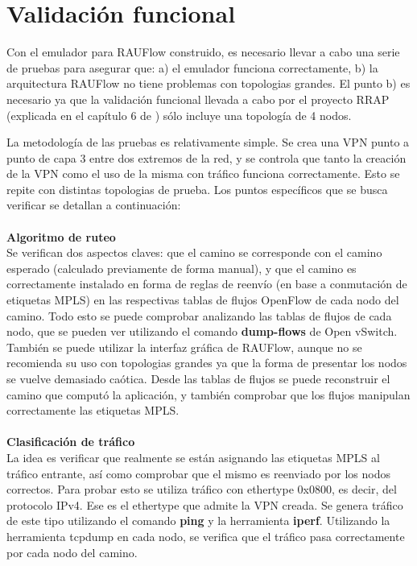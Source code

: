 \section{Validación funcional}
Con el emulador para RAUFlow construido, es necesario llevar a cabo una serie de pruebas para asegurar que: a) el emulador funciona correctamente, b) la arquitectura RAUFlow no tiene problemas con topologias grandes. El punto b) es necesario ya que la validación funcional llevada a cabo por el proyecto RRAP (explicada en el capítulo 6 de \cite{proyecto-rrap}) sólo incluye una topología de 4 nodos.

La metodología de las pruebas es relativamente simple. Se crea una VPN punto a punto de capa 3 entre dos extremos de la red, y se controla que tanto la creación de la VPN como el uso de la misma con tráfico funciona correctamente. Esto se repite con distintas topologias de prueba. Los puntos específicos que se busca verificar se detallan a continuación: \\ \\
\textbf{Algoritmo de ruteo} \\
Se verifican dos aspectos claves: que el camino se corresponde con el camino esperado (calculado previamente de forma manual), y que el camino es correctamente instalado en forma de reglas de reenvío (en base a conmutación de etiquetas MPLS) en las respectivas tablas de flujos OpenFlow de cada nodo del camino. Todo esto se puede comprobar analizando las tablas de flujos de cada nodo, que se pueden ver utilizando el comando \textbf{dump-flows} de Open vSwitch. También se puede utilizar la interfaz gráfica de RAUFlow, aunque no se recomienda su uso con topologias grandes ya que la forma de presentar los nodos se vuelve demasiado caótica. Desde las tablas de flujos se puede reconstruir el camino que computó la aplicación, y también comprobar que los flujos manipulan correctamente las etiquetas MPLS. \\ \\
\textbf{Clasificación de tráfico} \\
La idea es verificar que realmente se están asignando las etiquetas MPLS al tráfico entrante, así como comprobar que el mismo es reenviado por los nodos correctos. Para probar esto se utiliza tráfico con ethertype 0x0800, es decir, del protocolo IPv4. Ese es el ethertype que admite la VPN creada. Se genera tráfico de este tipo utilizando el comando \textbf{ping} y la herramienta \textbf{iperf}. Utilizando la herramienta tcpdump en cada nodo, se verifica que el tráfico pasa correctamente por cada nodo del camino. \\

